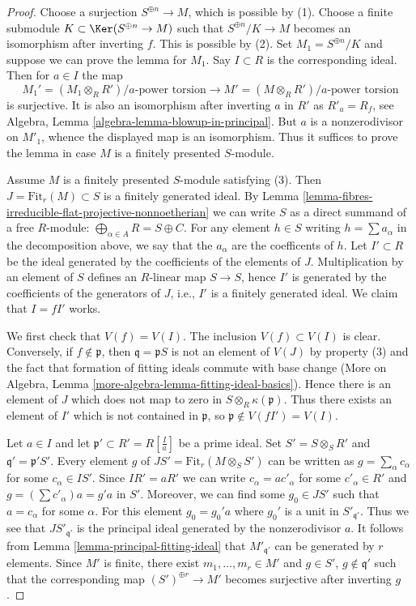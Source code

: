 \begin{proof}
Choose a surjection $S^{\oplus n} \to M$, which is possible by (1).
Choose a finite submodule $K \subset \Ker(S^{\oplus n} \to M)$
such that $S^{\oplus n}/K \to M$ becomes an isomorphism after inverting $f$.
This is possible by (2). Set $M_1 = S^{\oplus n}/K$ and suppose we can
prove the lemma for $M_1$. Say $I \subset R$ is the corresponding ideal.
Then for $a \in I$ the map
$$
M_1' = (M_1 \otimes_R R')/a\text{-power torsion}
\longrightarrow
M' = (M \otimes_R R')/a\text{-power torsion}
$$
is surjective. It is also an isomorphism after inverting $a$ in $R'$
as $R'_a = R_f$, see Algebra, Lemma \ref{algebra-lemma-blowup-in-principal}.
But $a$ is a nonzerodivisor on $M'_1$, whence the displayed map is an
isomorphism. Thus it suffices to prove the lemma in case $M$ is a finitely
presented $S$-module.

\medskip\noindent
Assume $M$ is a finitely presented $S$-module satisfying (3).
Then $J = \text{Fit}_r(M) \subset S$ is a finitely generated ideal.
By Lemma \ref{lemma-fibres-irreducible-flat-projective-nonnoetherian}
we can write $S$ as a direct summand of a free
$R$-module: $\bigoplus_{\alpha \in A} R = S \oplus C$.
For any element $h \in S$ writing $h = \sum a_\alpha$ in the
decomposition above, we say that the $a_\alpha$ are the coefficents of $h$.
Let $I' \subset R$ be the ideal generated by the coefficients
of the elements of $J$. Multiplication by an element of $S$ defines
an $R$-linear map $S \to S$, hence $I'$ is generated by the coefficients
of the generators of $J$, i.e., $I'$ is a finitely generated ideal.
We claim that $I = fI'$ works.

\medskip\noindent
We first check that $V(f) = V(I)$. The inclusion $V(f) \subset V(I)$ is
clear. Conversely, if $f \not \in \mathfrak p$, then
$\mathfrak q =  \mathfrak p S$ is not an element of $V(J)$ by
property (3) and the fact that formation of fitting ideals commute with
base change
(More on Algebra, Lemma \ref{more-algebra-lemma-fitting-ideal-basics}).
Hence there is an
element of $J$ which does not map to zero in $S \otimes_R \kappa(\mathfrak p)$.
Thus there exists an element of $I'$ which is not contained in
$\mathfrak p$, so $\mathfrak p \not \in V(fI') = V(I)$.

\medskip\noindent
Let $a \in I$ and let $\mathfrak p' \subset R' = R[\frac{I}{a}]$ be
a prime ideal. Set $S' = S \otimes_S R'$ and
$\mathfrak q' = \mathfrak p'S'$. Every element $g$ of
$JS' = \text{Fit}_r(M \otimes_S S')$ can be
written as $g = \sum_\alpha c_\alpha$ for some $c_\alpha \in IS'$.
Since $IR' = aR'$ we can write $c_\alpha = ac'_\alpha$ for some
$c'_\alpha \in R'$ and $g = (\sum c'_\alpha)a = g'a$ in $S'$.
Moreover, we can find some $g_0 \in JS'$ such that $a = c_\alpha$ for some
$\alpha$. For this element $g_0 = g_0' a$ where $g_0'$ is a unit in
$S'_{\mathfrak q'}$. Thus we see that $JS'_{\mathfrak q'}$ is the
principal ideal generated by the nonzerodivisor $a$. It follows from
Lemma \ref{lemma-principal-fitting-ideal}
that $M'_{\mathfrak q'}$ can be generated by $r$ elements.
Since $M'$ is finite, there exist $m_1, \ldots, m_r \in M'$ and
$g \in S'$, $g \not \in \mathfrak q'$ such that the corresponding map
$(S')^{\oplus r} \to M'$ becomes surjective after inverting $g$.


\end{proof}
